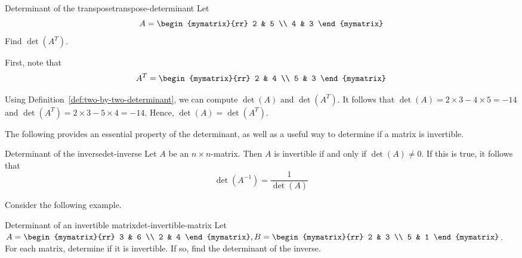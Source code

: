 \begin{example}{Determinant of the transpose}{transpose-determinant}
Let
\begin{equation*}
A
=
\begin{mymatrix}{rr}
2 & 5 \\
4 & 3
\end{mymatrix}
\end{equation*}
Find $\det (A^T)$.
\end{example}

\begin{solution}
First, note that 
\begin{equation*}
A^{T}
=
\begin{mymatrix}{rr}
2 & 4 \\
5 & 3
\end{mymatrix}
\end{equation*}

Using Definition~\ref{def:two-by-two-determinant}, we can compute $\det (A)$ and $\det (A^T)$. It follows that
$\det (A) = 2 \times 3 - 4 \times 5 = -14$ and $\det (A^T) = 2 \times 3 - 5 \times 4 = -14$. 
Hence, $\det (A) = \det (A^T)$.
\end{solution}

The following provides an essential property of the determinant, as well as a useful way to determine if a matrix is invertible.

\begin{theorem}{Determinant of the inverse}{det-inverse}
Let $A$ be an $n \times n$-matrix. Then $A$ is invertible if and only if $\det(A) \neq 0$. If this is true, it follows that 
\[
\det(A^{-1}) = \frac{1}{\det(A)}
\]
\end{theorem}

Consider the following example.

\begin{example}{Determinant of an invertible matrix}{det-invertible-matrix}
Let $A = \begin{mymatrix}{rr}
3 & 6 \\
2 & 4 
\end{mymatrix}, B = \begin{mymatrix}{rr}
2 & 3 \\
5 & 1
\end{mymatrix}$. For each matrix, determine if it is invertible. If so, find the determinant of the inverse. 
\end{example}

